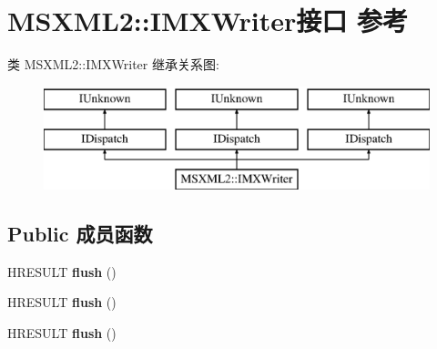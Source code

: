 \hypertarget{interface_m_s_x_m_l2_1_1_i_m_x_writer}{}\section{M\+S\+X\+M\+L2\+:\+:I\+M\+X\+Writer接口 参考}
\label{interface_m_s_x_m_l2_1_1_i_m_x_writer}
类 M\+S\+X\+M\+L2\+:\+:I\+M\+X\+Writer 继承关系图\+:\begin{figure}[H]
\begin{center}
\leavevmode
\includegraphics[height=3.000000cm]{interface_m_s_x_m_l2_1_1_i_m_x_writer}
\end{center}
\end{figure}
\subsection*{Public 成员函数}
\begin{DoxyCompactItemize}
\item 
\mbox{\label{interface_m_s_x_m_l2_1_1_i_m_x_writer_acd627b62355b843bf3c5602f60a96078}} 
H\+R\+E\+S\+U\+LT {\bfseries flush} ()
\item 
\mbox{\label{interface_m_s_x_m_l2_1_1_i_m_x_writer_acd627b62355b843bf3c5602f60a96078}} 
H\+R\+E\+S\+U\+LT {\bfseries flush} ()
\item 
\mbox{\label{interface_m_s_x_m_l2_1_1_i_m_x_writer_acd627b62355b843bf3c5602f60a96078}} 
H\+R\+E\+S\+U\+LT {\bfseries flush} ()
\end{DoxyCompactItemize}
